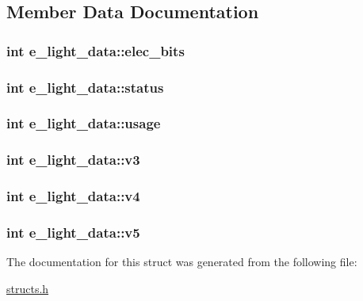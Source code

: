 \subsection{Member Data Documentation}
\hypertarget{structe__light__data_a4a2f59f9d1fd02fdc1a5b1bcfd15935c}{
\subsubsection[{elec\-\_\-bits}]{\setlength{\rightskip}{0pt plus 5cm}int e\-\_\-light\-\_\-data\-::elec\-\_\-bits}}\label{structe__light__data_a4a2f59f9d1fd02fdc1a5b1bcfd15935c}
\hypertarget{structe__light__data_ab853ee68a144f323a30746d3c6390355}{
\subsubsection[{status}]{\setlength{\rightskip}{0pt plus 5cm}int e\-\_\-light\-\_\-data\-::status}}\label{structe__light__data_ab853ee68a144f323a30746d3c6390355}
\hypertarget{structe__light__data_a1f4fbe78d6dfe140d0c0cad87c426583}{
\subsubsection[{usage}]{\setlength{\rightskip}{0pt plus 5cm}int e\-\_\-light\-\_\-data\-::usage}}\label{structe__light__data_a1f4fbe78d6dfe140d0c0cad87c426583}
\hypertarget{structe__light__data_aa9fbb5ee228b191ebf6a53a7aab5dc70}{
\subsubsection[{v3}]{\setlength{\rightskip}{0pt plus 5cm}int e\-\_\-light\-\_\-data\-::v3}}\label{structe__light__data_aa9fbb5ee228b191ebf6a53a7aab5dc70}
\hypertarget{structe__light__data_a51054be16dbcafab9ff59294c1feeb4b}{
\subsubsection[{v4}]{\setlength{\rightskip}{0pt plus 5cm}int e\-\_\-light\-\_\-data\-::v4}}\label{structe__light__data_a51054be16dbcafab9ff59294c1feeb4b}
\hypertarget{structe__light__data_adadbf877a642b5a33fbcfe764043cfc5}{
\subsubsection[{v5}]{\setlength{\rightskip}{0pt plus 5cm}int e\-\_\-light\-\_\-data\-::v5}}\label{structe__light__data_adadbf877a642b5a33fbcfe764043cfc5}


The documentation for this struct was generated from the following file\-:\begin{DoxyCompactItemize}
\item 
\hyperlink{structs_8h}{structs.\-h}\end{DoxyCompactItemize}
